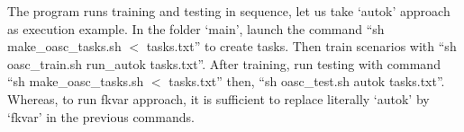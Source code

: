 \documentclass[tablecaption=bottom,wcp]{jmlr} %
\begin{document}
The program runs training and testing in sequence, let us take `autok' approach as execution example. In the folder `main', launch the command ``sh make\_oasc\_tasks.sh $<$ tasks.txt'' to create tasks. Then train scenarios with ``sh oasc\_train.sh run\_autok tasks.txt''. After training, run testing with command ``sh make\_oasc\_tasks.sh $<$ tasks.txt'' then, ``sh oasc\_test.sh autok tasks.txt''. Whereas, to run fkvar approach, it is sufficient to replace literally `autok' by `fkvar' in the previous commands. 



\appendix
\end{document}

